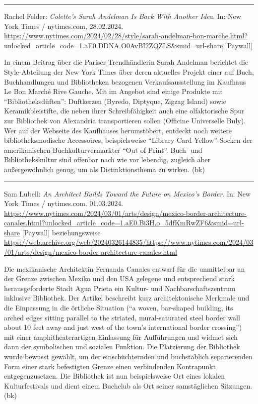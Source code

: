 \documentclass[a4paper,
fontsize=11pt,
oneside,
numbers=noperiodatend,
parskip=half-,
bibliography=totoc,
final
]{scrartcl}
\begin{document}
\begin{center}\rule{0.5\linewidth}{0.5pt}\end{center}

Rachel Felder: \emph{Colette's Sarah Andelman Is Back With Another
Idea}. In: New York Times / nytimes.com, 28.02.2024.
\url{https://www.nytimes.com/2024/02/28/style/sarah-andelman-bon-marche.html?unlocked_article_code=1.aE0.DDNA.O0AvBI2ZQZLS\&smid=url-share}
{[}Paywall{]}

In einem Beitrag über die Pariser Trendhändlerin Sarah Andelman
berichtet die Style-Abteilung der New York Times über deren aktuelles
Projekt einer auf Buch, Buchhandlungen und Bibliotheken bezogenen
Verkaufsausstellung im Kaufhaus Le Bon Marché Rive Gauche. Mit im
Angebot sind einige Produkte mit \enquote{Bibliotheksdüften}: Duftkerzen
(Byredo, Diptyque, Zigzag Island) sowie Keramikbleistifte, die neben
ihrer Schreibfähigkeit auch eine olfaktorische Spur zur Bibliothek von
Alexandria transportieren sollen (Officine Universelle Buly). Wer auf
der Webseite des Kaufhauses herumstöbert, entdeckt noch weitere
bibliotheksmodische Accessoires, beispielsweise \enquote{Library Card
Yellow}-Socken der amerikanischen Buchkulturvermarkter \enquote{Out of
Print}. Buch- und Bibliothekskultur sind offenbar nach wie vor lebendig,
zugleich aber außergewöhnlich genug, um als Distinktionsthema zu wirken.
(bk)

\begin{center}\rule{0.5\linewidth}{0.5pt}\end{center}

Sam Lubell: \emph{An Architect Builds Toward the Future on Mexico's
Border}. In: New York Times / nytimes.com. 01.03.2024.
\url{https://www.nytimes.com/2024/03/01/arts/design/mexico-border-architecture-canales.html?unlocked_article_code=1.aE0.Bi3H.o_5dfKmRwZF6\&smid=url-share}
{[}Paywall{]} beziehungsweise
\url{https://web.archive.org/web/20240326144835/https://www.nytimes.com/2024/03/01/arts/design/mexico-border-architecture-canales.html}

Die mexikanische Architektin Fernanda Canales entwarf für die
unmittelbar an der Grenze zwischen Mexiko und den USA gelegene und
entsprechend stark herausgeforderte Stadt Agua Prieta ein Kultur- und
Nachbarschaftszentrum inklusive Bibliothek. Der Artikel beschreibt kurz
architektonische Merkmale und die Einpassung in die örtliche Situation
(\enquote{a woven, bar-shaped building, its arched edges sitting
parallel to the striated, mural-saturated steel border wall about 10
feet away and just west of the town's international border crossing})
mit einer amphitheaterartigen Einlassung für Aufführungen und widmet
sich dann der symbolischen und sozialen Funktion. Die Platzierung der
Bibliothek wurde bewusst gewählt, um der einschüchternden und
buchstäblich separierenden Form einer stark befestigten Grenze einen
verbindenden Kontrapunkt entgegenzusetzen. Die Bibliothek ist nun
beispielsweise Ort eines lokalen Kulturfestivals und dient einem
Buchclub als Ort seiner samstäglichen Sitzungen. (bk)
\end{document}
